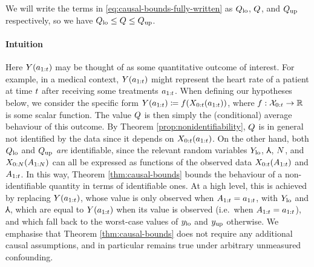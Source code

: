 \noindent
We will write the terms in \eqref{eq:causal-bounds-fully-written} as $Q_{\mathrm{lo}}$, $Q$, and $Q_{\mathrm{up}}$ respectively, so we have $Q_{\mathrm{lo}} \leq Q \leq Q_{\mathrm{up}}$.

\paragraph{Intuition}

Here $Y(a_{1:t})$ may be thought of as some quantitative outcome of interest.
For example, in a medical context, $Y(a_{1:t})$ might represent the heart rate of a patient at time $t$ after receiving some treatments $a_{1:t}$.
When defining our hypotheses below, we consider the specific form $Y(a_{1:t}) \coloneqq f(X_{0:t}(a_{1:t}))$, where $f : \mathcal{X}_{0:t} \to \mathbb{R}$ is some scalar function.
The value $Q$ is then simply the (conditional) average behaviour of this outcome.
By Theorem \ref{prop:nonidentifiability}, $Q$ is in general not identified by the data since it depends on $X_{0:t}(a_{1:t})$.
%
%
%
On the other hand, both $Q_{\mathrm{lo}}$ and $Q_{\mathrm{up}}$ \emph{are} identifiable, since the relevant random variables $Y_{\mathrm{lo}}$, $\Yup$, $N$, and $X_{0:N}(A_{1:N})$ can all be expressed as functions of the observed data $X_{0:t}(A_{1:t})$ and $A_{1:t}$.
In this way, Theorem \ref{thm:causal-bounds} bounds the behaviour of a non-identifiable quantity in terms of identifiable ones.
At a high level, this is achieved by replacing $Y(a_{1:t})$, whose value is only observed when $A_{1:t} = a_{1:t}$, with $Y_{\mathrm{lo}}$ and $\Yup$, which are equal to $Y(a_{1:t})$ when its value is observed (i.e.\ when $A_{1:t} = a_{1:t}$), and which fall back to the worst-case values of $y_{\mathrm{lo}}$ and $y_{\mathrm{up}}$ otherwise.
%
We emphasise that Theorem \ref{thm:causal-bounds} does not require any additional causal assumptions, and in particular remains true under arbitrary unmeasured confounding.

%
%

%

